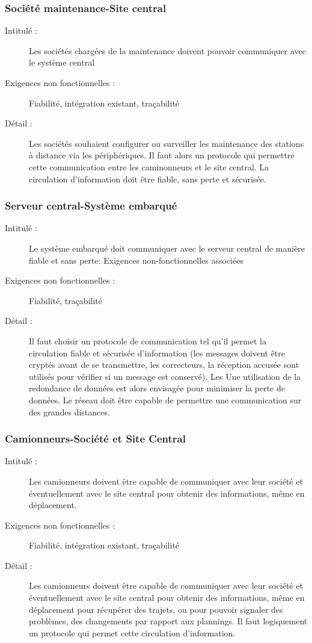 \subsubsection {Société maintenance-Site central}
\begin{description}
           \item[Intitulé :] Les sociétés chargées de la maintenance doivent pouvoir communiquer avec le système central 
           \item[Exigences non fonctionnelles :] Fiabilité, intégration existant, traçabilité
           \item[Détail :] Les sociétés souhaient configurer ou surveiller les maintenance des stations à distance via les périphériques. Il faut alors un protocole qui permettre cette communication entre les caminonneurs et le site central. La circulation d'information
doit être fiable, sans perte et sécurisée. 
\end{description}

\subsubsection {Serveur central-Système embarqué}
\begin{description}
           \item[Intitulé :] Le système embarqué doit communiquer avec le serveur central de manière fiable et sans perte:
Exigences non-fonctionnelles associées
           \item[Exigences non fonctionnelles :]  Fiabilité, traçabilité 
           \item[Détail :] Il faut choisir un protocole de communication tel qu'il permet la circulation fiable et sécurisée d’information (les messages doivent être cryptés avant de se transmettre, les correcteurs, la réception accusée sont utilisés pour vérifier si un message est conservé). Les
Une utilisation de la redondance de données est alors envisagée pour minimiser la perte de données. Le réseau doit être capable 
de permettre une communication sur des grandes distances.
\end{description}

\subsubsection {Camionneurs-Société et Site Central}
\begin{description}
           \item[Intitulé :] Les camionneurs doivent être capable de communiquer avec leur société et éventuellement avec le site central pour obtenir des informations, même en déplacement.
           \item[Exigences non fonctionnelles :] Fiabilité, intégration existant, traçabilité
           \item[Détail :]  Les camionneurs doivent être capable de communiquer avec leur société et éventuellement avec le site central pour obtenir des informations, même en déplacement pour récupérer des trajets, ou pour pouvoir signaler des problèmes, des changements
par rapport aux plannings. Il faut logiquement un protocole qui permet cette circulation d'information. 
\end{description}

